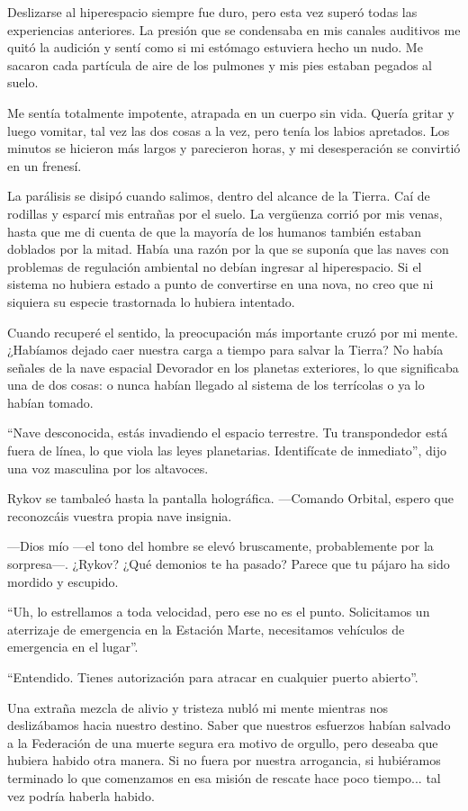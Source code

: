 Deslizarse al hiperespacio siempre fue duro, pero esta vez superó todas las experiencias anteriores. La presión que se condensaba en mis canales auditivos me quitó la audición y sentí como si mi estómago estuviera hecho un nudo. Me sacaron cada partícula de aire de los pulmones y mis pies estaban pegados al suelo.

Me sentía totalmente impotente, atrapada en un cuerpo sin vida. Quería gritar y luego vomitar, tal vez las dos cosas a la vez, pero tenía los labios apretados. Los minutos se hicieron más largos y parecieron horas, y mi desesperación se convirtió en un frenesí.

La parálisis se disipó cuando salimos, dentro del alcance de la Tierra. Caí de rodillas y esparcí mis entrañas por el suelo. La vergüenza corrió por mis venas, hasta que me di cuenta de que la mayoría de los humanos también estaban doblados por la mitad. Había una razón por la que se suponía que las naves con problemas de regulación ambiental no debían ingresar al hiperespacio. Si el sistema no hubiera estado a punto de convertirse en una nova, no creo que ni siquiera su especie trastornada lo hubiera intentado.

Cuando recuperé el sentido, la preocupación más importante cruzó por mi mente. ¿Habíamos dejado caer nuestra carga a tiempo para salvar la Tierra? No había señales de la nave espacial Devorador en los planetas exteriores, lo que significaba una de dos cosas: o nunca habían llegado al sistema de los terrícolas o ya lo habían tomado.

``Nave desconocida, estás invadiendo el espacio terrestre. Tu transpondedor está fuera de línea, lo que viola las leyes planetarias. Identifícate de inmediato'', dijo una voz masculina por los altavoces.

Rykov se tambaleó hasta la pantalla holográfica. —Comando Orbital, espero que reconozcáis vuestra propia nave insignia.

—Dios mío —el tono del hombre se elevó bruscamente, probablemente por la sorpresa—. ¿Rykov? ¿Qué demonios te ha pasado? Parece que tu pájaro ha sido mordido y escupido.

``Uh, lo estrellamos a toda velocidad, pero ese no es el punto. Solicitamos un aterrizaje de emergencia en la Estación Marte, necesitamos vehículos de emergencia en el lugar''.

``Entendido. Tienes autorización para atracar en cualquier puerto abierto''.

Una extraña mezcla de alivio y tristeza nubló mi mente mientras nos deslizábamos hacia nuestro destino. Saber que nuestros esfuerzos habían salvado a la Federación de una muerte segura era motivo de orgullo, pero deseaba que hubiera habido otra manera. Si no fuera por nuestra arrogancia, si hubiéramos terminado lo que comenzamos en esa misión de rescate hace poco tiempo... tal vez podría haberla habido.

